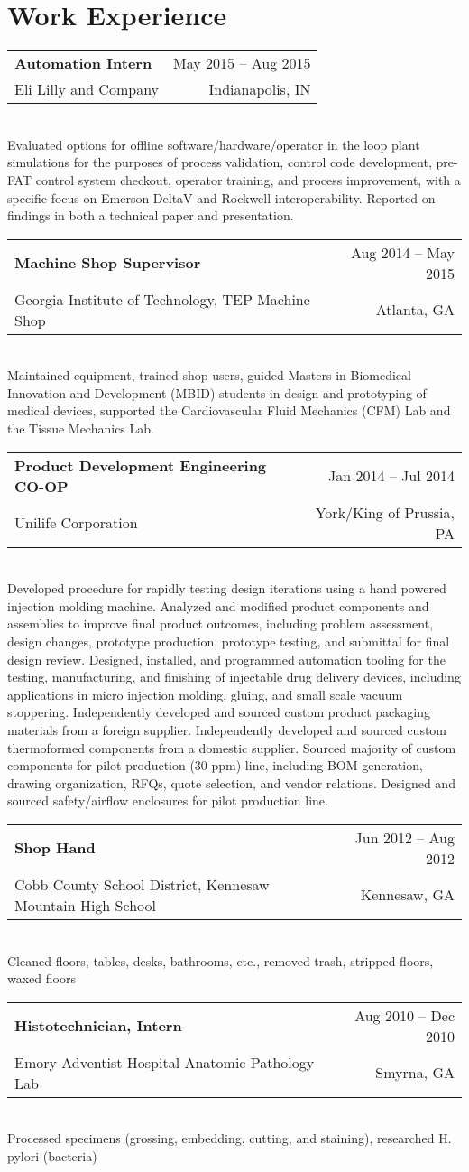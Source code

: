 \documentclass[10pt, letter]{article}
\makeatletter
\newlength{\currentparskip}
\newlength{\cvindent}
\newenvironment{cvsection}[1]{
    \section*{#1}   
}{
}
\newcommand{\cvitem}[6]{
    \setlength{\currentparskip}{\parskip}%
    \strut\hfill\begin{minipage}{\dimexpr\textwidth-\cvindent}
    \setlength{\parskip}{\currentparskip}%
    \begin{tabular*}{\linewidth}{@{}l@{\extracolsep{\fill}}r@{}}
        \textbf{#1} & #4 -- #5\\
        #2 & #3
    \end{tabular*}\\[.05cm]
    #6
    \end{minipage}
    \vspace{.3cm}
}
\makeatother
\begin{document}
\begin{cvsection}{Work Experience}
    \cvitem{Automation Intern}{Eli Lilly and Company}{Indianapolis, IN}{May 2015}{Aug 2015}{Evaluated options for offline software/hardware/operator in the loop plant simulations for the purposes of process validation, control code development, pre-FAT control system checkout, operator training, and process improvement, with a specific focus on Emerson DeltaV and Rockwell interoperability. Reported on findings in both a technical paper and presentation.}

    \cvitem{Machine Shop Supervisor}{Georgia Institute of Technology, TEP Machine Shop}{Atlanta, GA}{Aug 2014}{May 2015}{Maintained equipment, trained shop users, guided Masters in Biomedical Innovation and Development (MBID) students in design and prototyping of medical devices, supported the Cardiovascular Fluid Mechanics (CFM) Lab and the Tissue Mechanics Lab. }
    
    \cvitem{Product Development Engineering CO-OP}{Unilife Corporation}{York/King of Prussia, PA}{Jan 2014}{Jul 2014}{
    Developed procedure for rapidly testing design iterations using a hand powered injection molding machine. 
    Analyzed and modified product components and assemblies to improve final product outcomes, including problem assessment, design changes, prototype production, prototype testing, and submittal for final design review. 
    Designed, installed, and programmed automation tooling for the testing, manufacturing, and finishing of injectable drug delivery devices, including applications in micro injection molding, gluing, and small scale vacuum stoppering. 
    Independently developed and sourced custom product packaging materials from a foreign supplier.
    Independently developed and sourced custom thermoformed components from a domestic supplier. 
    Sourced majority of custom components for pilot production (30 ppm) line, including BOM generation, drawing organization, RFQs, quote selection, and vendor relations. 
    Designed and sourced safety/airflow enclosures for pilot production line.}

    \cvitem{Shop Hand}{Cobb County School District, Kennesaw Mountain High School}{Kennesaw, GA}{Jun 2012}{Aug 2012}{Cleaned floors, tables, desks, bathrooms, etc., removed trash, stripped floors, waxed floors}

    \cvitem{Histotechnician, Intern }{Emory-Adventist Hospital Anatomic Pathology Lab}{Smyrna, GA }{Aug 2010}{Dec 2010}{Processed specimens (grossing, embedding, cutting, and staining), researched H. pylori (bacteria) }


\end{cvsection}
\end{document}

